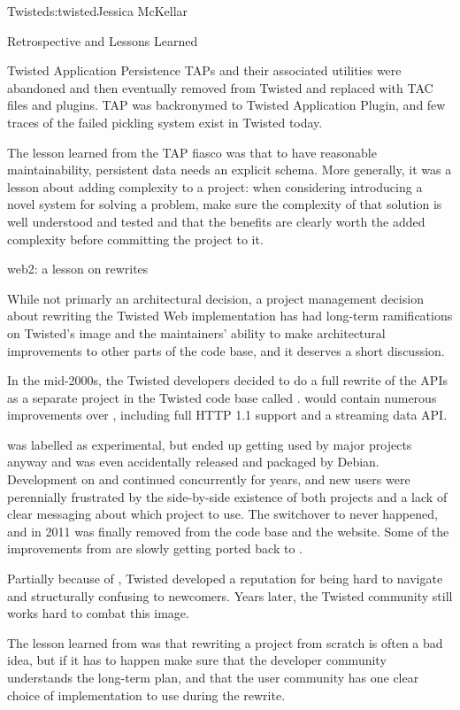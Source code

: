 \begin{aosachapter}{Twisted}{s:twisted}{Jessica McKellar}
\begin{aosasect1}{Retrospective and Lessons Learned}
\begin{aosasect2}{Twisted Application Persistence}
TAPs and their associated utilities were abandoned and then eventually
removed from Twisted and replaced with TAC files and plugins. TAP was
backronymed to Twisted Application Plugin, and few traces of the failed pickling
system exist in Twisted today.

The lesson learned from the TAP fiasco was that to have reasonable
maintainability, persistent data needs an explicit schema. More generally, it
was a lesson about adding complexity to a project: when considering introducing
a novel system for solving a problem, make sure the complexity of that solution
is well understood and tested and that the benefits are clearly worth the added
complexity before committing the project to it.

\end{aosasect2}

\begin{aosasect2}{web2: a lesson on rewrites}

While not primarly an architectural decision, a project management decision
about rewriting the Twisted Web implementation has had long-term ramifications
on Twisted's image and the maintainers' ability to make architectural
improvements to other parts of the code base, and it deserves a short
discussion.

In the mid-2000s, the Twisted developers decided to do a full rewrite of the
 APIs as a separate project in the Twisted code base
called .  would contain numerous improvements
over , including full HTTP 1.1 support and a streaming
data API.

 was labelled as experimental, but ended up getting used by
major projects anyway and was even accidentally released and packaged by
Debian. Development on  and  continued
concurrently for years, and new users were perennially frustrated by the
side-by-side existence of both projects and a lack of clear messaging about
which project to use. The switchover to  never happened, and in
2011  was finally removed from the code base and the
website. Some of the improvements from  are slowly getting
ported back to .

Partially because of , Twisted developed a reputation for
being hard to navigate and structurally confusing to newcomers. Years later, the
Twisted community still works hard to combat this image.

The lesson learned from  was that rewriting a project from
scratch is often a bad idea, but if it has to happen make sure that the
developer community understands the long-term plan, and that the user community
has one clear choice of implementation to use during the rewrite.


\end{aosasect2}
\end{aosasect1}
\end{aosachapter}
